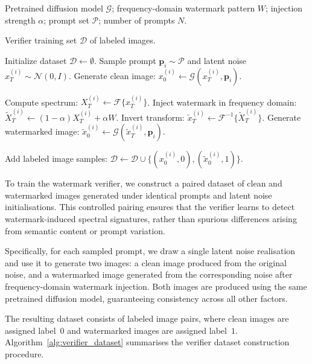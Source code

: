 \documentclass[lettersize,journal,review]{IEEEtran}
\begin{document}
\begin{algorithm}[t]
\caption{Verifier Training Dataset Construction}
\label{alg:verifier_dataset}
\begin{algorithmic}[1]
\Require
Pretrained diffusion model $\mathcal{G}$;
frequency-domain watermark pattern $W$;
injection strength $\alpha$;
prompt set $\mathcal{P}$;
number of prompts $N$.

\Ensure
Verifier training set $\mathcal{D}$ of labeled images.

\State Initialize dataset $\mathcal{D} \leftarrow \emptyset$.
    \State Sample prompt $\mathbf{p}_i \sim \mathcal{P}$ and latent noise $x_T^{(i)} \sim \mathcal{N}(0,I)$.
    \State Generate clean image: $x_0^{(i)} \leftarrow \mathcal{G}(x_T^{(i)}, \mathbf{p}_i)$.

    \State Compute spectrum: $X_T^{(i)} \leftarrow \mathcal{F}\{x_T^{(i)}\}$.
    \State Inject watermark in frequency domain:
    \State \hspace{1.2em} $\tilde{X}_T^{(i)} \leftarrow (1-\alpha)X_T^{(i)} + \alpha W$.
    \State Invert transform: $\tilde{x}_T^{(i)} \leftarrow \mathcal{F}^{-1}\{\tilde{X}_T^{(i)}\}$.
    \State Generate watermarked image: $\tilde{x}_0^{(i)} \leftarrow \mathcal{G}(\tilde{x}_T^{(i)}, \mathbf{p}_i)$.

    \State Add labeled image samples:
    \State \hspace{1.2em} $\mathcal{D} \leftarrow \mathcal{D} \cup \{(x_0^{(i)},0), (\tilde{x}_0^{(i)},1)\}$.
\EndFor
\end{algorithmic}
\end{algorithm}

To train the watermark verifier, we construct a paired dataset of clean and watermarked images generated under identical prompts and latent noise initialisations. 
This controlled pairing ensures that the verifier learns to detect watermark-induced spectral signatures, rather than spurious differences arising from semantic content or prompt variation.

Specifically, for each sampled prompt, we draw a single latent noise realisation and use it to generate two images: a clean image produced from the original noise, and a watermarked image generated from the corresponding noise after frequency-domain watermark injection. 
Both images are produced using the same pretrained diffusion model, guaranteeing consistency across all other factors.

The resulting dataset consists of labeled image pairs, where clean images are assigned label~$0$ and watermarked images are assigned label~$1$. Algorithm~\ref{alg:verifier_dataset} summarises the verifier dataset construction procedure.
\end{document}
